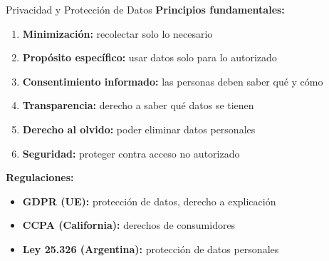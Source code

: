 \documentclass[aspectratio=169]{beamer}
\begin{document}
\begin{frame}{Privacidad y Protección de Datos}
\textbf{Principios fundamentales:}

\begin{enumerate}
\item \textbf{Minimización:} recolectar solo lo necesario
\item \textbf{Propósito específico:} usar datos solo para lo autorizado
\item \textbf{Consentimiento informado:} las personas deben saber qué y cómo
\item \textbf{Transparencia:} derecho a saber qué datos se tienen
\item \textbf{Derecho al olvido:} poder eliminar datos personales
\item \textbf{Seguridad:} proteger contra acceso no autorizado
\end{enumerate}

\vspace{0.3cm}

\textbf{Regulaciones:}
\begin{itemize}
\item \textbf{GDPR (UE):} protección de datos, derecho a explicación
\item \textbf{CCPA (California):} derechos de consumidores
\item \textbf{Ley 25.326 (Argentina):} protección de datos personales
\end{itemize}
\end{frame}
\end{document}
